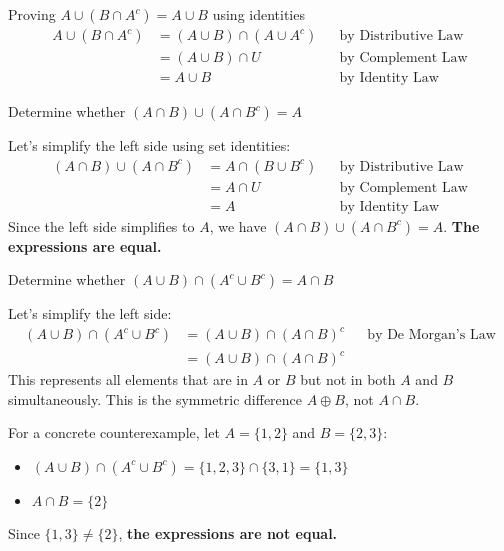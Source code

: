 \begin{example}{Proving $A \cup (B \cap A^c) = A \cup B$ using identities}
\begin{align*}
    A \cup (B \cap A^c) &= (A \cup B) \cap (A \cup A^c) && \text{by Distributive Law} \\
    &= (A \cup B) \cap U && \text{by Complement Law} \\
    &= A \cup B && \text{by Identity Law}
\end{align*}
\end{example}

\begin{example}{Determine whether $(A \cap B) \cup (A \cap B^c) = A$}
\begin{solution}
Let's simplify the left side using set identities:
\begin{align*}
    (A \cap B) \cup (A \cap B^c) &= A \cap (B \cup B^c) && \text{by Distributive Law} \\
    &= A \cap U && \text{by Complement Law} \\
    &= A && \text{by Identity Law}
\end{align*}
Since the left side simplifies to $A$, we have $(A \cap B) \cup (A \cap B^c) = A$. \textbf{The expressions are equal.}
\end{solution}
\end{example}

\begin{example}{Determine whether $(A \cup B) \cap (A^c \cup B^c) = A \cap B$}
\begin{solution}
Let's simplify the left side:
\begin{align*}
    (A \cup B) \cap (A^c \cup B^c) &= (A \cup B) \cap (A \cap B)^c && \text{by De Morgan's Law} \\
    &= (A \cup B) \cap (A \cap B)^c
\end{align*}
This represents all elements that are in $A$ or $B$ but not in both $A$ and $B$ simultaneously. This is the symmetric difference $A \oplus B$, not $A \cap B$.

For a concrete counterexample, let $A = \{1, 2\}$ and $B = \{2, 3\}$:
\begin{itemize}
    \item $(A \cup B) \cap (A^c \cup B^c) = \{1, 2, 3\} \cap \{3, 1\} = \{1, 3\}$
    \item $A \cap B = \{2\}$
\end{itemize}
Since $\{1, 3\} \neq \{2\}$, \textbf{the expressions are not equal.}
\end{solution}
\end{example}


